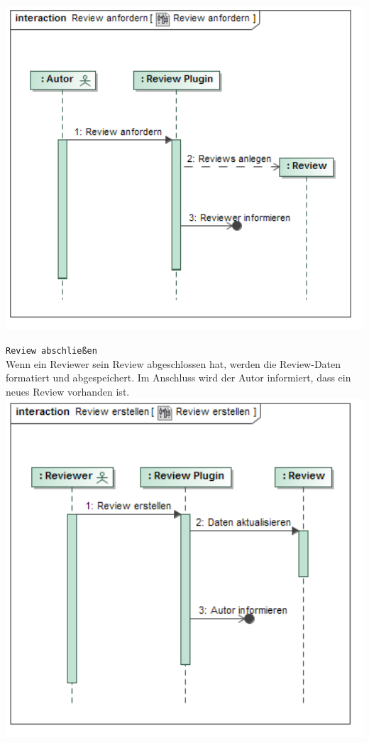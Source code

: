 \documentclass[a4paper]{scrreprt}
\begin{document}
\includegraphics[width=1.0\textwidth]{Sequence_Diagram__Review_anfordern__Review_anfordern.png}
\label{Review anfordern}

\newpage
\texttt{Review abschließen}\\
Wenn ein Reviewer sein Review abgeschlossen hat, werden die Review-Daten formatiert und abgespeichert. Im Anschluss wird der Autor informiert, dass ein neues Review vorhanden ist.\\

\includegraphics[width=1.0\textwidth]{Sequence_Diagram__Review_erstellen__Review_erstellen.png}
\label{Review beenden}
\end{document}
